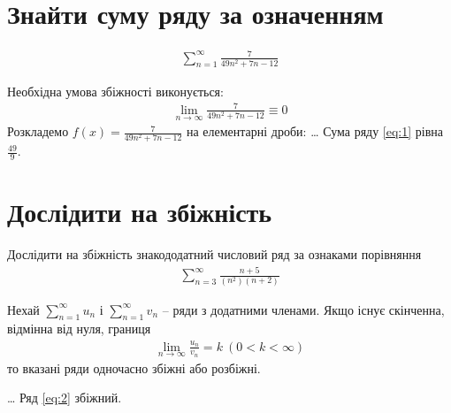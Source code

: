 \documentclass[\mainDocument]{subfiles}
\begin{document}
	\nocite{*}
	\chapter{Знайти суму ряду за означенням}
	\begin{gather}
		\sum_{n=1}^\infty\frac{7}{49n^2+7n-12} \label{eq:1}
	\end{gather}

	\solving
	Необхідна умова збіжності виконується:
	\begin{gather}
		\lim_{n\to\infty} \frac{7}{49n^2+7n-12} \equiv 0
	\end{gather}
	Розкладемо \(f(x) = \frac{7}{49n^2+7n-12}\) на елементарні дроби:
	\ldots
	\ansver
	Сума ряду \ref{eq:1} рівна \(\frac{49}{9}\).

	\chapter{Дослідити на збіжність}
	Дослідити на збіжність знакододатний числовий ряд за ознаками порівняння
	\begin{gather}
		\sum_{n=3}^\infty \frac{n+5}{(n^2)(n+2)} \label{eq:2}
	\end{gather}

	\begin{thm}
		\label{dfn:zbiz}
		Нехай \(\sum_{n=1}^\infty u_n\) і \(\sum_{n=1}^\infty v_n\) -- ряди з додатними членами. Якщо існує скінченна, відмінна від нуля, границя
		\begin{gather}
			\lim_{n\to\infty}\frac{u_n}{v_n}=k\ (0<k<\infty)
		\end{gather}
		то вказані ряди одночасно збіжні або розбіжні.
	\end{thm}
	\solving
	\ldots
	\ansver
	Ряд \ref{eq:2} збіжний.
\end{document}
